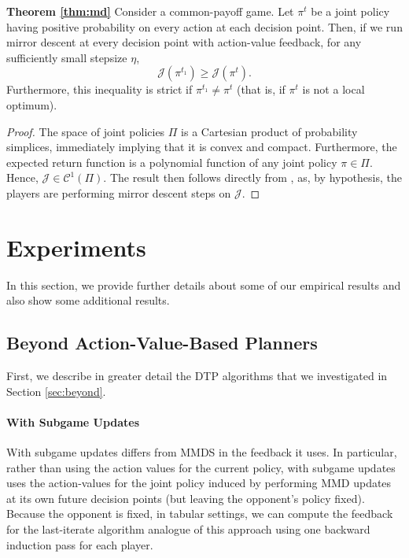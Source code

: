 \documentclass{article} %
\theoremstyle{plain}
\theoremstyle{definition}
\theoremstyle{remark}
\begin{document}
\textbf{Theorem \ref{thm:md}} Consider a common-payoff game. 
Let $\pi^t$ be a joint policy having positive probability on every action at each decision point. 
Then, if we run mirror descent at every decision point with action-value feedback, for any
sufficiently small stepsize $\eta$,
\[\mathcal{J}(\pi^{t_1}) \geq \mathcal{J}(\pi^t).\]
Furthermore, this inequality is strict if $\pi^{t_1} \neq \pi^t$ (that is, if $\pi^t$ is not a local optimum).

\begin{proof}
The space of joint policies $\Pi$ is a Cartesian product of probability simplices, immediately implying that it is convex and compact.
Furthermore, the expected return function is a polynomial function of any joint policy $\pi \in \Pi$.
Hence, $\mathcal{J} \in \mathcal{C}^1(\Pi)$.
The result then follows directly from , as, by hypothesis, the players are performing mirror descent steps on $\mathcal{J}$.
\end{proof}

\section{Experiments}

In this section, we provide further details about some of our empirical results and also show some additional results.

\subsection{Beyond Action-Value-Based Planners} \label{app:beyond}

First, we describe in greater detail the DTP algorithms that we investigated in Section \ref{sec:beyond}.

\paragraph{With Subgame Updates}

With subgame updates differs from MMDS in the feedback it uses.
In particular, rather than using the action values for the current policy, with subgame updates uses the action-values for the joint policy induced by performing MMD updates at its own future decision points (but leaving the opponent's policy fixed).
Because the opponent is fixed, in tabular settings, we can compute the feedback for the last-iterate algorithm analogue of this approach using one backward induction pass for each player.
\end{document}
